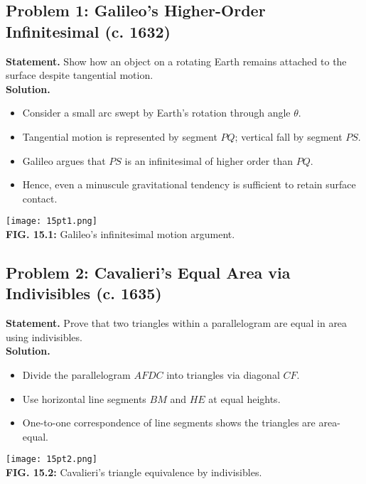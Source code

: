\documentclass[9pt]{article}
\begin{document}
\subsection*{Problem 1: Galileo’s Higher-Order Infinitesimal (c. 1632)}
\textbf{Statement.} Show how an object on a rotating Earth remains attached to the surface despite tangential motion. \\
\textbf{Solution.}
\begin{itemize}
  \item Consider a small arc swept by Earth’s rotation through angle \( \theta \).
  \item Tangential motion is represented by segment \( PQ \); vertical fall by segment \( PS \).
  \item Galileo argues that \( PS \) is an infinitesimal of higher order than \( PQ \).
  \item Hence, even a minuscule gravitational tendency is sufficient to retain surface contact.
\end{itemize}
\begin{center}
\texttt{[image: 15pt1.png]} \\
\textbf{FIG. 15.1:} Galileo’s infinitesimal motion argument.
\end{center}

\newpage

\subsection*{Problem 2: Cavalieri’s Equal Area via Indivisibles (c. 1635)}
\textbf{Statement.} Prove that two triangles within a parallelogram are equal in area using indivisibles. \\
\textbf{Solution.}
\begin{itemize}
  \item Divide the parallelogram \( AFDC \) into triangles via diagonal \( CF \).
  \item Use horizontal line segments \( BM \) and \( HE \) at equal heights.
  \item One-to-one correspondence of line segments shows the triangles are area-equal.
\end{itemize}
\begin{center}
\texttt{[image: 15pt2.png]} \\
\textbf{FIG. 15.2:} Cavalieri’s triangle equivalence by indivisibles.
\end{center}

\newpage
\end{document}
